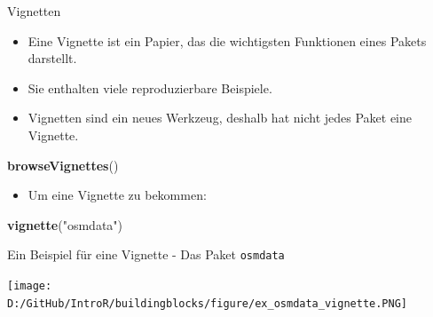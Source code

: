 \documentclass[ignorenonframetext,]{beamer}
\newenvironment{Shaded}{\begin{snugshade}}{\end{snugshade}}
\newcommand{\KeywordTok}[1]{\textcolor[rgb]{0.26,0.66,0.93}{\textbf{#1}}}
\newcommand{\NormalTok}[1]{\textcolor[rgb]{0.74,0.68,0.62}{#1}}
\newcommand{\StringTok}[1]{\textcolor[rgb]{0.02,0.61,0.04}{#1}}
\providecommand{\tightlist}{%
  \setlength{\itemsep}{0pt}\setlength{\parskip}{0pt}}
\begin{document}
\begin{frame}[fragile]{Vignetten}
\protect\hypertarget{vignetten}{}

\begin{itemize}
\tightlist
\item
  Eine Vignette ist ein Papier, das die wichtigsten Funktionen eines
  Pakets darstellt.
\item
  Sie enthalten viele reproduzierbare Beispiele.
\item
  Vignetten sind ein neues Werkzeug, deshalb hat nicht jedes Paket eine
  Vignette.
\end{itemize}

\begin{Shaded}
\begin{Highlighting}[]
\KeywordTok{browseVignettes}\NormalTok{()}
\end{Highlighting}
\end{Shaded}

\begin{itemize}
\tightlist
\item
  Um eine Vignette zu bekommen:
\end{itemize}

\begin{Shaded}
\begin{Highlighting}[]
\KeywordTok{vignette}\NormalTok{(}\StringTok{"osmdata"}\NormalTok{)}
\end{Highlighting}
\end{Shaded}

\end{frame}

\begin{frame}{Ein Beispiel für eine Vignette - Das Paket
\texttt{osmdata}}
\protect\hypertarget{ein-beispiel-fur-eine-vignette---das-paket-osmdata}{}

\texttt{[image: D:/GitHub/IntroR/buildingblocks/figure/ex\_osmdata\_vignette.PNG]}

\end{frame}
\end{document}
